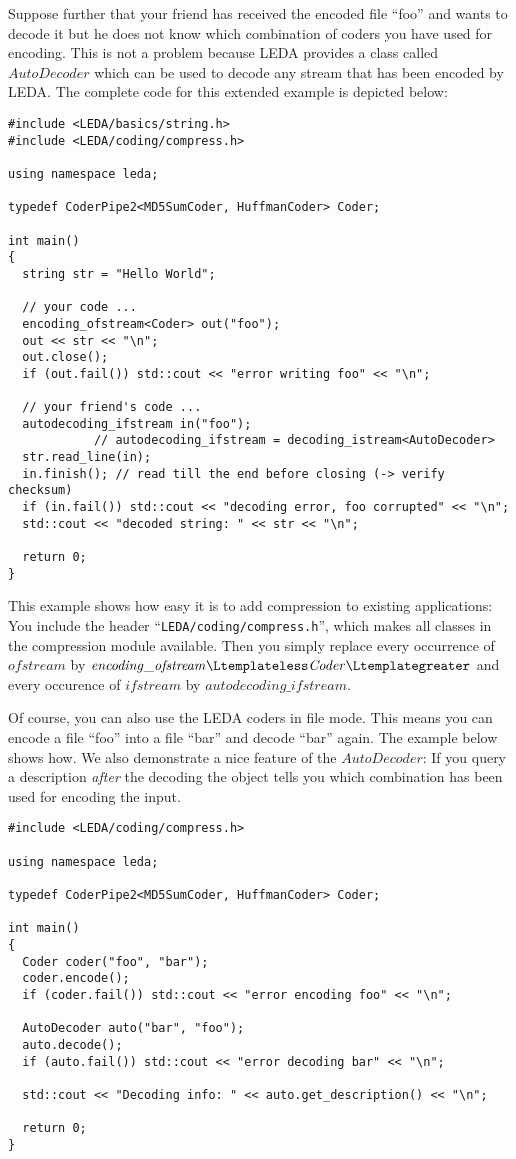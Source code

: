 Suppose further that your friend has received the encoded file ``foo'' and
wants to decode it but he does not know which combination of coders you have
used for encoding. This is not a problem because LEDA provides a class called
$\mathit{AutoDecoder}$ which can be used to decode any stream that has been
encoded by LEDA. The complete code for this extended example is depicted below:

\begin{verbatim}
#include <LEDA/basics/string.h>
#include <LEDA/coding/compress.h>

using namespace leda;

typedef CoderPipe2<MD5SumCoder, HuffmanCoder> Coder;

int main()
{
  string str = "Hello World";

  // your code ...
  encoding_ofstream<Coder> out("foo");
  out << str << "\n";
  out.close();
  if (out.fail()) std::cout << "error writing foo" << "\n";

  // your friend's code ...
  autodecoding_ifstream in("foo"); 
            // autodecoding_ifstream = decoding_istream<AutoDecoder>
  str.read_line(in);
  in.finish(); // read till the end before closing (-> verify checksum)
  if (in.fail()) std::cout << "decoding error, foo corrupted" << "\n";
  std::cout << "decoded string: " << str << "\n";

  return 0;
}
\end{verbatim}

This example shows how easy it is to add compression to existing applications:
You include the header ``{\tt LEDA/coding/compress.h}'', which makes all 
classes in the compression module available.
Then you simply replace every occurrence of $\mathit{ofstream}$ by
$\mathit{encoding\_ofstream}\Ltemplateless\mathit{Coder}\Ltemplategreater$ and
every occurence of $\mathit{ifstream}$ by $\mathit{autodecoding\_ifstream}$.

Of course, you can also use the LEDA coders in file mode. This means you can 
encode a file ``foo'' into a file ``bar'' and decode ``bar'' again. The example
below shows how. 
We also demonstrate a nice feature of the $\mathit{AutoDecoder}$: If you query
a description \emph{after} the decoding the object tells you which combination
has been used for encoding the input.

\begin{verbatim}
#include <LEDA/coding/compress.h>

using namespace leda;

typedef CoderPipe2<MD5SumCoder, HuffmanCoder> Coder;

int main()
{
  Coder coder("foo", "bar");
  coder.encode();
  if (coder.fail()) std::cout << "error encoding foo" << "\n";

  AutoDecoder auto("bar", "foo");
  auto.decode();
  if (auto.fail()) std::cout << "error decoding bar" << "\n";

  std::cout << "Decoding info: " << auto.get_description() << "\n";

  return 0;
}
\end{verbatim}

